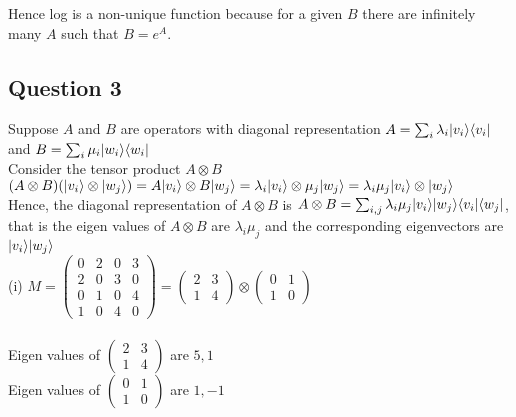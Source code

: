 \documentclass{article}
\DeclarePairedDelimiter\bra{\langle}{\rvert}
\DeclarePairedDelimiter\ket{\lvert}{\rangle}
\begin{document}
\noindent
Hence log is a non-unique function because for a given $B$ there are infinitely many $A$ such that $B = e^A$. 
\subsection{Question 3}

Suppose $A$ and $B$ are operators with diagonal representation $A = \sum_{i} \lambda_i \ket{v_i}\bra{v_i}$ and $B = \sum_{i} \mu_i \ket{w_i}\bra{w_i}$\\

\noindent
Consider the tensor product $A \otimes B$\\

$(A \otimes B)(\ket{v_i} \otimes \ket{w_j}) = A\ket{v_i} \otimes B\ket{w_j} = \lambda_i \ket{v_i} \otimes \mu_j \ket{w_j} = \lambda_i \mu_j \ket{v_i} \otimes \ket{w_j}$\\ 

\noindent
Hence, the diagonal representation of $A \otimes B$ is $A \otimes B = \sum_{i,j} \lambda_i \mu_j \ket{v_i}\ket{w_j}\bra{v_i}\bra{w_j}$, that is the eigen values of $A \otimes B$ are $\lambda_i \mu_j$ and the corresponding eigenvectors are $\ket{v_i}\ket{w_j}$\\

\noindent
(i) $M = \begin{pmatrix}
    0 & 2 & 0 & 3\\
    2 & 0 & 3 & 0\\
    0 & 1 & 0 & 4\\
    1 & 0 & 4 & 0
\end{pmatrix}
 =    \begin{pmatrix}2 & 3\\ 1 & 4 \end{pmatrix} \otimes \begin{pmatrix} 0 & 1\\ 1 & 0 \end{pmatrix}$\\\\

\noindent
Eigen values of $\begin{pmatrix}2 & 3\\ 1 & 4 \end{pmatrix}$ are $5,1$ \\
Eigen values of $\begin{pmatrix} 0 & 1\\ 1 & 0 \end{pmatrix}$ are $1,-1$\\
\end{document}
